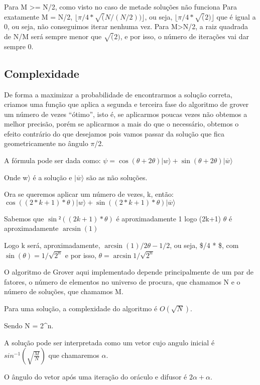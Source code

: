 \documentclass[11pt]{article}
\begin{document}
    Para M \textgreater= N/2, como visto no caso de metade soluções não
funciona Para exatamente M = N/2,
\(\lfloor \pi/4 * \sqrt(N/(N/2))\rfloor\), ou seja,
\(\lfloor \pi/4 * \sqrt(2)\rfloor\) que é igual a 0, ou seja, não
conseguimos iterar nenhuma vez. Para M\textgreater N/2, a raiz quadrada
de N/M será sempre menor que \(\sqrt(2)\), e por isso, o número de
iterações vai dar sempre 0.

    \hypertarget{complexidade}{%
\subsection{Complexidade}\label{complexidade}}

De forma a maximizar a probabilidade de encontrarmos a solução correta,
criamos uma função que aplica a segunda e terceira fase do algoritmo de
grover um número de vezes ``ótimo'', isto é, se aplicarmos poucas vezes
não obtemos a melhor precisão, porém se aplicarmos a mais do que o
necessário, obtemos o efeito contrário do que desejamos pois vamos
passar da solução que fica geometricamente no ângulo \(\pi\)/2.

A fórmula pode ser dada como:
\(\psi = \cos(\theta + 2\theta)|w\rangle + \sin(\theta + 2\theta)|\overline w\rangle\)

Onde \textbar w\(\rangle\) é a solução e \(|\overline w\rangle\) são as
não soluções.

Ora se queremos aplicar um número de vezes, k, então:
\(\cos((2*k+1)*\theta)|w\rangle + \sin((2*k+1)*\theta)|\overline w\rangle\)

Sabemos que \(\sin²((2k+1)*\theta)\) é aproximadamente 1 logo (2k+1)
\(\theta\) é aproximadamente \(\arcsin(1)\)

Logo k será, aproximadamente, \(\arcsin(1)/2\theta - 1/2\), ou seja,
\$\lfloor \pi/4 *  \rfloor \$, com
\(\sin(\theta) = 1/\sqrt{2^n}\) e por isso,
\(\theta = \arcsin1/\sqrt{2^n}\)

O algoritmo de Grover aqui implementado depende principalmente de um par
de fatores, o número de elementos no universo de procura, que chamamos N
e o número de soluções, que chamamos M.

Para uma solução, a complexidade do algoritmo é \(O(\sqrt{N})\).

Sendo N = 2\^{}n.

A solução pode ser interpretada como um vetor cujo angulo inicial é
\(sin^{-1}(\sqrt{\frac{M}{N}})\) que chamaremos \(\alpha\).

O ângulo do vetor após uma iteração do oráculo e difusor é
\(2\alpha + \alpha\).
\end{document}
